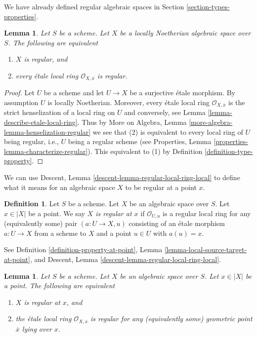 \documentclass{stacks-project}
\theoremstyle{plain}
\newtheorem{lemma}[subsection]{Lemma}
\theoremstyle{definition}
\newtheorem{definition}[subsection]{Definition}
\theoremstyle{remark}
\numberwithin{equation}{subsection}
\begin{document}
\noindent
We have already defined regular algebraic spaces in
Section \ref{section-types-properties}.

\begin{lemma}
\label{lemma-regular}
Let $S$ be a scheme.
Let $X$ be a locally Noetherian algebraic space over $S$.
The following are equivalent
\begin{enumerate}
\item $X$ is regular, and
\item every \'etale local ring $\mathcal{O}_{X, \overline{x}}$ is
regular.
\end{enumerate}
\end{lemma}

\begin{proof}
Let $U$ be a scheme and let $U \to X$ be a surjective \'etale morphism.
By assumption $U$ is locally Noetherian. Moreover, every \'etale local
ring $\mathcal{O}_{X, \overline{x}}$ is the strict henselization of
a local ring on $U$ and conversely, see
Lemma \ref{lemma-describe-etale-local-ring}.
Thus by
More on Algebra, Lemma \ref{more-algebra-lemma-henselization-regular}
we see that (2) is equivalent to every local ring of $U$ being
regular, i.e., $U$ being a regular scheme (see
Properties, Lemma \ref{properties-lemma-characterize-regular}).
This equivalent to (1) by
Definition \ref{definition-type-property}.
\end{proof}

\noindent
We can use Descent, Lemma \ref{descent-lemma-regular-local-ring-local}
to define what it means for an algebraic space $X$ to be regular at a
point $x$.

\begin{definition}
\label{definition-regular-at-point}
Let $S$ be a scheme. Let $X$ be an algebraic space over $S$.
Let $x \in |X|$ be a point. We say {\it $X$ is regular at $x$}
if $\mathcal{O}_{U, u}$ is a regular local ring for any
(equivalently some) pair $(a : U \to X, u)$ consisting of an
\'etale morphism $a : U \to X$ from a scheme to $X$ and a point
$u \in U$ with $a(u) = x$.
\end{definition}

\noindent
See Definition \ref{definition-property-at-point},
Lemma \ref{lemma-local-source-target-at-point}, and
Descent, Lemma \ref{descent-lemma-regular-local-ring-local}.

\begin{lemma}
\label{lemma-regular-at-x}
Let $S$ be a scheme. Let $X$ be an algebraic space over $S$.
Let $x \in |X|$ be a point. The following are equivalent
\begin{enumerate}
\item $X$ is regular at $x$, and
\item the \'etale local ring $\mathcal{O}_{X, \overline{x}}$ is
regular for any (equivalently some) geometric point $\overline{x}$
lying over $x$.
\end{enumerate}
\end{lemma}
\end{document}
